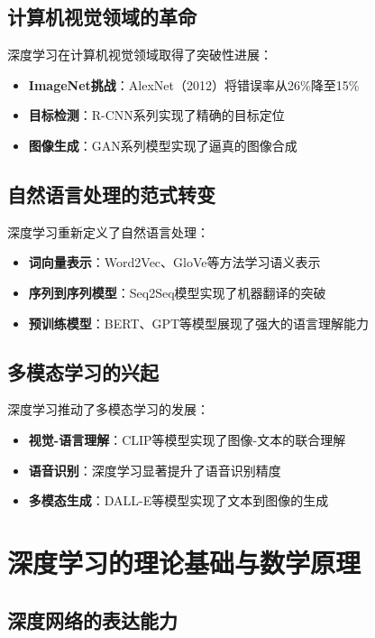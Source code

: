\subsection{计算机视觉领域的革命}

深度学习在计算机视觉领域取得了突破性进展：

\begin{itemize}
\item {\bf ImageNet挑战}：AlexNet（2012）将错误率从26\%降至15\%
\item {\bf 目标检测}：R-CNN系列实现了精确的目标定位
\item {\bf 图像生成}：GAN系列模型实现了逼真的图像合成
\end{itemize}

\subsection{自然语言处理的范式转变}

深度学习重新定义了自然语言处理：

\begin{itemize}
\item {\bf 词向量表示}：Word2Vec、GloVe等方法学习语义表示
\item {\bf 序列到序列模型}：Seq2Seq模型实现了机器翻译的突破
\item {\bf 预训练模型}：BERT、GPT等模型展现了强大的语言理解能力
\end{itemize}

\subsection{多模态学习的兴起}

深度学习推动了多模态学习的发展：

\begin{itemize}
\item {\bf 视觉-语言理解}：CLIP等模型实现了图像-文本的联合理解
\item {\bf 语音识别}：深度学习显著提升了语音识别精度
\item {\bf 多模态生成}：DALL-E等模型实现了文本到图像的生成
\end{itemize}

\section{深度学习的理论基础与数学原理}

\subsection{深度网络的表达能力}

